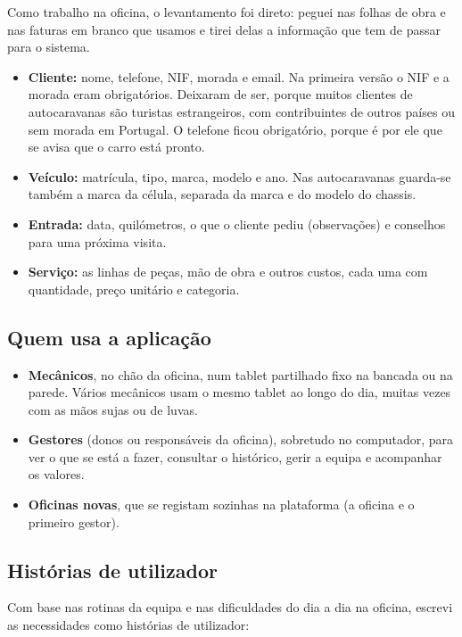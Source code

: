 \documentclass[a4paper,12pt]{article}
\begin{document}
Como trabalho na oficina, o levantamento foi direto: peguei nas folhas de obra e nas faturas em branco que usamos e tirei delas a informação que tem de passar para o sistema.

\begin{itemize}
    \item \textbf{Cliente:} nome, telefone, \ac{NIF}, morada e email. Na primeira versão o \ac{NIF} e a morada eram obrigatórios. Deixaram de ser, porque muitos clientes de autocaravanas são turistas estrangeiros, com contribuintes de outros países ou sem morada em Portugal. O telefone ficou obrigatório, porque é por ele que se avisa que o carro está pronto.
    \item \textbf{Veículo:} matrícula, tipo, marca, modelo e ano. Nas autocaravanas guarda-se também a marca da célula, separada da marca e do modelo do chassis.
    \item \textbf{Entrada:} data, quilómetros, o que o cliente pediu (observações) e conselhos para uma próxima visita.
    \item \textbf{Serviço:} as linhas de peças, mão de obra e outros custos, cada uma com quantidade, preço unitário e categoria.
\end{itemize}

\subsection{Quem usa a aplicação}

\begin{itemize}
    \item \textbf{Mecânicos}, no chão da oficina, num tablet partilhado fixo na bancada ou na parede. Vários mecânicos usam o mesmo tablet ao longo do dia, muitas vezes com as mãos sujas ou de luvas.
    \item \textbf{Gestores} (donos ou responsáveis da oficina), sobretudo no computador, para ver o que se está a fazer, consultar o histórico, gerir a equipa e acompanhar os valores.
    \item \textbf{Oficinas novas}, que se registam sozinhas na plataforma (a oficina e o primeiro gestor).
\end{itemize}

\subsection{Histórias de utilizador}

Com base nas rotinas da equipa e nas dificuldades do dia a dia na oficina, escrevi as necessidades como histórias de utilizador:
\end{document}
